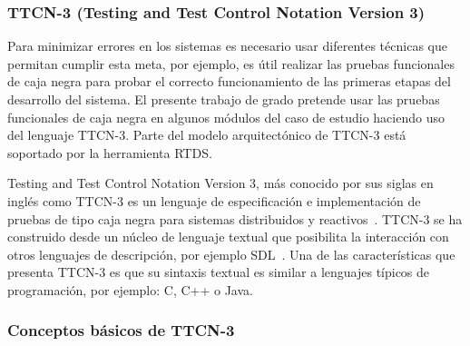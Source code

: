 \subsubsection{TTCN-3 (Testing and Test Control Notation Version 3)}


Para minimizar errores en los sistemas es necesario usar diferentes t\'ecnicas 
que permitan cumplir esta meta, por ejemplo, es \'util realizar las pruebas 
funcionales de caja negra para probar el correcto funcionamiento de las primeras 
etapas del desarrollo del sistema. El presente trabajo de grado pretende usar 
las pruebas funcionales de caja negra en algunos m\'odulos del caso de estudio 
haciendo uso del lenguaje TTCN-3. Parte del modelo arquitect\'onico de TTCN-3 
est\'a soportado por la herramienta RTDS. 

Testing and Test Control Notation Version 3, m\'as conocido por sus siglas en 
ingl\'es como TTCN-3 es un lenguaje de especificaci\'on e implementaci\'on de 
pruebas de tipo caja negra para sistemas distribuidos y 
reactivos~\cite{Grabowski2003}. TTCN-3 se ha construido desde un n\'ucleo de 
lenguaje 
textual que posibilita la interacci\'on con otros lenguajes de descripci\'on, 
por ejemplo SDL~\cite{Grabowski2003,Willcock2011}. Una de las 
caracter\'isticas que presenta TTCN-3 es que su sintaxis textual es similar a 
lenguajes t\'ipicos de programaci\'on, por ejemplo: C, C++ o Java.

\subsubsection{Conceptos b\'asicos de TTCN-3}

